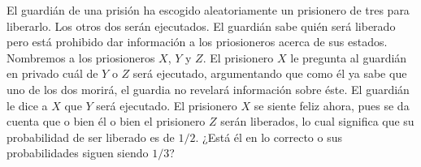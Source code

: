 \begin{statement}{7}
  El guardi\'an de una prisi\'on ha escogido aleatoriamente un prisionero de tres para liberarlo.
  Los otros dos ser\'an ejecutados.
  El guardi\'an sabe qui\'en ser\'a liberado pero est\'a prohibido dar informaci\'on a los priosioneros
  acerca de sus estados.
  Nombremos a los priosioneros $X$, $Y$ y $Z$.
  El prisionero $X$ le pregunta al guardi\'an en privado cu\'al de $Y$ o $Z$ ser\'a ejecutado,
  argumentando que como \'el ya sabe que uno de los dos morir\'a, el guardia no revelar\'a informaci\'on sobre \'este.
  El guardi\'an le dice a $X$ que $Y$ ser\'a ejecutado.
  El prisionero $X$ se siente feliz ahora, pues se da cuenta que o bien \'el o bien el prisionero $Z$ ser\'an
  liberados, lo cual significa que su probabilidad de ser liberado es de $1 / 2$.
  ¿Est\'a \'el en lo correcto o sus probabilidades siguen siendo $1 / 3$?
\end{statement}